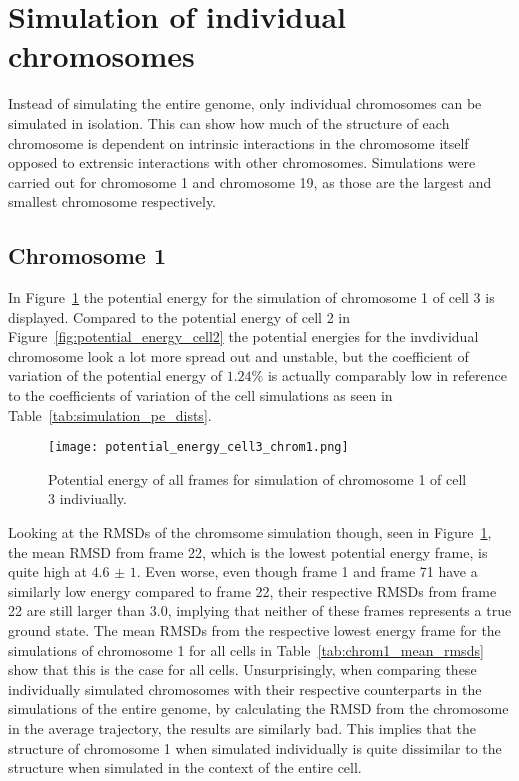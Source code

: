 
\section{Simulation of individual chromosomes} %
\label{sec:simulation_of_individual_chromosomes}

Instead of simulating the entire genome, only individual chromosomes can be simulated in isolation. This can show how much of the structure of each chromosome is dependent on intrinsic interactions in the chromosome itself opposed to extrensic interactions with other chromosomes. Simulations were carried out for chromosome 1 and chromosome 19, as those are the largest and smallest chromosome respectively.

\subsection{Chromosome 1} %
\label{ssec:chromosome_1}

In Figure~\ref{fig:potential_energy_cell3_chrom1} the potential energy for the simulation of chromosome 1 of cell 3 is displayed. Compared to the potential energy of cell 2 in Figure~\ref{fig:potential_energy_cell2} the potential energies for the invdividual chromosome look a lot more spread out and unstable, but the coefficient of variation of the potential energy of \(1.24 \%\) is actually comparably low in reference to the coefficients of variation of the cell simulations as seen in Table~\ref{tab:simulation_pe_dists}. 

\begin{figure}[ht]
\centering
	\texttt{[image: potential\_energy\_cell3\_chrom1.png]}
	\caption{Potential energy of all frames for simulation of chromosome 1 of cell 3 indiviually.}
	\label{fig:potential_energy_cell3_chrom1}
\end{figure}

Looking at the RMSDs of the chromsome simulation though, seen in Figure~\ref{fig:potential_energy_cell3_chrom1}, the mean RMSD from frame 22, which is the lowest potential energy frame, is quite high at \(\num{4.6(10)}\). Even worse, even though frame 1 and frame 71 have a similarly low energy compared to frame 22, their respective RMSDs from frame 22 are still larger than \(3.0\), implying that neither of these frames represents a true ground state. The mean RMSDs from the respective lowest energy frame for the simulations of chromosome 1 for all cells in Table~\ref{tab:chrom1_mean_rmsds} show that this is the case for all cells. Unsurprisingly, when comparing these individually simulated chromosomes with their respective counterparts in the simulations of the entire genome, by calculating the RMSD from the chromosome in the average trajectory, the results are similarly bad. This implies that the structure of chromosome 1 when simulated individually is quite dissimilar to the structure when simulated in the context of the entire cell.

